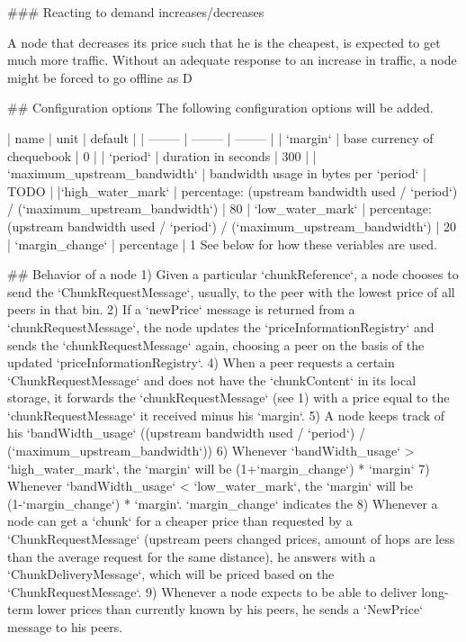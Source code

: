 ### Reacting to demand increases/decreases

A node that decreases its price such that he is the cheapest, is expected to get much more traffic. Without an adequate response to an increase in traffic, a node might be forced to go offline as D

## Configuration options
The following configuration options will be added. 

| name | unit | default |
| -------- | -------- | -------- |
| `margin`     | base currency of chequebook     | 0     |
| `period`      | duration in seconds    | 300     |
| `maximum_upstream_bandwidth`      | bandwidth usage in bytes per `period`     | TODO     |
|`high_water_mark`    | percentage: (upstream bandwidth used / `period`) / (`maximum_upstream_bandwidth`)     | 80%
| `low_water_mark`    | percentage: (upstream bandwidth used / `period`) / (`maximum_upstream_bandwidth`)      | 20%
| `margin_change`    | percentage    | 1%
See below for how these veriables are used.


## Behavior of a node
1) Given a particular `chunkReference`, a node chooses to send the `ChunkRequestMessage`, usually, to the peer with the lowest price of all peers in that bin.
2) If a `newPrice` message is returned from a `chunkRequestMessage`, the node updates the `priceInformationRegistry` and sends the `chunkRequestMessage` again, choosing a peer on the basis of the updated `priceInformationRegistry`. 
4) When a peer requests a certain `ChunkRequestMessage` and does not have the `chunkContent` in its local storage, it forwards the `chunkRequestMessage` (see 1) with a price equal to the `chunkRequestMessage` it received minus his `margin`.
5) A node keeps track of his `bandWidth_usage` ((upstream bandwidth used / `period`) / (`maximum_upstream_bandwidth`))
6) Whenever `bandWidth_usage` > `high_water_mark`, the `margin` will be (1+`margin_change`) * `margin`
7) Whenever `bandWidth_usage` < `low_water_mark`, the `margin` will be (1-`margin_change`) * `margin`. `margin_change` indicates the 
8) Whenever a node can get a `chunk` for a cheaper price than requested by a `ChunkRequestMessage` (upstream peers changed prices, amount of hops are less than the average request for the same distance), he answers with a `ChunkDeliveryMessage`, which will be priced based on the `ChunkRequestMessage`. 
9) Whenever a node expects to be able to deliver long-term lower prices than currently known by his peers, he sends a `NewPrice` message to his peers. 
